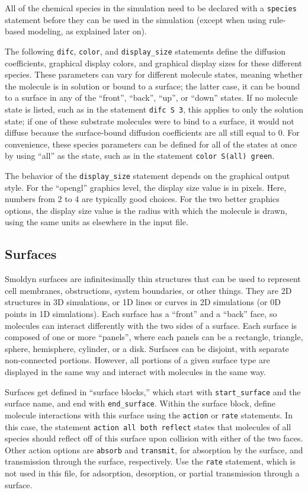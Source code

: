 \documentclass {scrbook}
\newcommand {\ttt} {\texttt}
\begin{document}
All of the chemical species in the simulation need to be declared with a  \ttt{species} statement before they can be used in the simulation (except when using rule-based modeling, as explained later on).

The following  \ttt{difc},  \ttt{color}, and  \ttt{display\_size} statements define the diffusion coefficients, graphical display colors, and graphical display sizes for these different species. These parameters can vary for different molecule states, meaning whether the molecule is in solution or bound to a surface; the latter case, it can be bound to a surface in any of the ``front'', ``back'', ``up'', or ``down'' states. If no molecule state is listed, such as in the statement  \ttt{difc S 3}, this applies to only the solution state; if one of these substrate molecules were to bind to a surface, it would not diffuse because the surface-bound diffusion coefficients are all still equal to 0. For convenience, these species parameters can be defined for all of the states at once by using ``all'' as the state, such as in the statement  \ttt{color S(all) green}.

The behavior of the \ttt{display\_size} statement depends on the graphical output style. For the ``opengl'' graphics level, the display size value is in pixels. Here, numbers from 2 to 4 are typically good choices. For the two better graphics options, the display size value is the radius with which the molecule is drawn, using the same units as elsewhere in the input file.

\subsection*{Surfaces}

Smoldyn surfaces are infinitesimally thin structures that can be used to represent cell membranes, obstructions, system boundaries, or other things. They are 2D structures in 3D simulations, or 1D lines or curves in 2D simulations (or 0D points in 1D simulations). Each surface has a ``front'' and a ``back'' face, so molecules can interact differently with the two sides of a surface. Each surface is composed of one or more ``panels'', where each panels can be a rectangle, triangle, sphere, hemisphere, cylinder, or a disk. Surfaces can be disjoint, with separate non-connected portions. However, all portions of a given surface type are displayed in the same way and interact with molecules in the same way.

Surfaces get defined in ``surface blocks,'' which start with  \ttt{start\_surface} and the surface name, and end with  \ttt{end\_surface}. Within the surface block, define molecule interactions with this surface using the  \ttt{action} or  \ttt{rate} statements. In this case, the statement  \ttt{action all both reflect} states that molecules of all species should reflect off of this surface upon collision with either of the two faces. Other action options are  \ttt{absorb} and  \ttt{transmit}, for absorption by the surface, and transmission through the surface, respectively. Use the  \ttt{rate} statement, which is not used in this file, for adsorption, desorption, or partial transmission through a surface.
\end{document}
